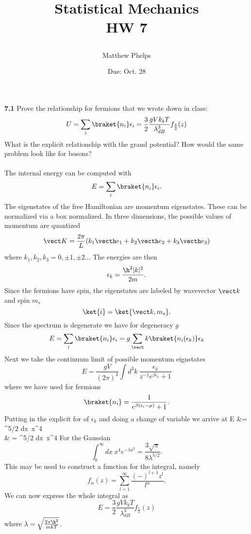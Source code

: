 \documentclass[11pt,letterpaper]{article}
\title{\begin{spacing}{1.2}Statistical Mechanics\\HW 7\end{spacing}}
\author{Matthew Phelps}
\date{Due: Oct. 28}
\begin{document}
\maketitle

\benum
  	\item[\textbf{7.1}]
	Prove the relationship for fermions that we wrote down in class:
	\[
		U = \sum_i \braket{n_i}\epsilon_i = \frac{3}{2}\frac{gVk_bT}{\lambda_{dB}^3}f_{\frac{5}{2}}(z)
	\]
	What is the explicit relationship with the grand potential? How would the same problem look like
	for bosons?
	\\
	\\
	The internal energy can be computed with 
	\[	
		E = \sum_i \braket{n_i}\epsilon_i.
	\]
	The eigenstates of the free Hamiltonian are momentum eigenstates. These can be normalized
	via a box normalized. In three dimensions, the possible values of momentum are quantized
	\[
		\vect K = \frac{2\pi}{L}(k_1\vecth e_1+ k_2 \vecth e_2+k_3 \vecth e_3)
	\]
	where $k_1,k_2,k_3 = 0,\pm 1,\pm 2..$. 
	The energies are then
	\[
		\epsilon_k = \frac{\h^2|k|^2}{2m}.
	\]
	Since the fermions have spin, the eigenstates are labeled by wavevector $\vect k$ and spin $m_s$
	\[
		\ket{i} = \ket{\vect k,m_s}.
	\]
	Since the spectrum is degenerate we have for degeneracy $g$
	\[
		E = \sum_i \braket{n_i}\epsilon_i = g\sum_\vect k \braket{n_i(\epsilon_k)}\epsilon_k
	\]
	Next we take the continuum limit of possible momentum eignstates
	\[
		E = \frac{gV}{(2\pi)^3}\int d^3k\ \frac{\epsilon_k}{z^{-1}e^{\beta\epsilon_k}+1}
	\]
	where we have used for fermions
	\[
		\braket{n_i} = \frac{1}{e^{\beta(\epsilon_i-\mu)}+1}.
	\]
	Putting in the explicit for of $\epsilon_k$ and doing a change of variable we arrive at
	\ba
		E &= 
		^{5/2} \int dx\ x^4  \\
		 & = 
		^{5/2} \int dx\ x^4 
	\ea
	For the Gaussian
	\[
		\int_0^\infty dx\ x^4 e^{-\lambda x^2} = \frac{3\sqrt\pi}{8\lambda^{5/2}}.
	\]
	This may be used to construct a function for the integral, namely
	\[
		f_\alpha(z)=\sum_{l=1}^\infty \frac{(-)^{l+1}z^l}{l^\alpha}.
	\]
	We can now express the whole integral as
	\[
		E = \frac{3}{2}\frac{gVk_bT}{\lambda_{dB}^3}f_{\frac{5}{2}}(z)
	\]
	where $\lambda = \sqrt{\frac{2\pi\h^2}{mkT}}$.
	\\
\end{document}
